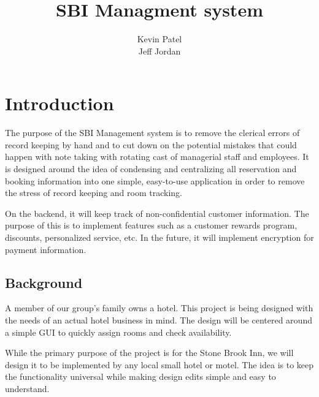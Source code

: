 \documentclass[10pt,conference,onecolumn,compsoc]{IEEEtran}
\begin{document}
\title{SBI Managment system}


\author{Kevin Patel\\Jeff Jordan
}

\maketitle

\IEEEdisplaynontitleabstractindextext

\IEEEpeerreviewmaketitle



\section{Introduction}

The purpose of the SBI Management system is to remove the clerical errors of record keeping by hand and to cut down on the potential mistakes that could happen with note taking with rotating cast of
managerial staff and employees. It is designed around the idea of condensing and centralizing all reservation and booking information into one simple, easy-to-use application in order to remove the stress of record keeping and room tracking. 

On the backend, it will keep track of non-confidential customer information. The purpose of this is to implement features such as a customer rewards program, discounts, personalized service, etc. In the future, it will implement encryption for payment information. 

\subsection{Background}
A member of our group's family owns a hotel. This project is being designed with the needs of an actual hotel business in mind. The design will be centered around a simple GUI to quickly assign rooms and check availability. 

While the primary purpose of the project is for the Stone Brook Inn, we will design it to be implemented by any local small hotel or motel. The idea is to keep the functionality universal while making design edits simple and easy to understand. 
\end{document}
